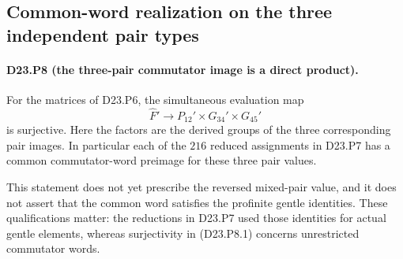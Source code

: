 \subsection{Common-word realization on the three independent pair types}

\paragraph{D23.P8 (the three-pair commutator image is a direct product).}
For the matrices of D23.P6, the simultaneous evaluation map
\[
 \widehat F'\longrightarrow
 P_{12}'\times G_{34}'\times G_{45}'
\tag{D23.P8.1}
\]
is surjective. Here the factors are the derived groups of the
three corresponding pair images. In particular each of the $216$
reduced assignments in D23.P7 has a common commutator-word
preimage for these three pair values.

This statement does not yet prescribe the reversed mixed-pair
value, and it does not assert that the common word satisfies
the profinite gentle identities. These qualifications matter:
the reductions in D23.P7 used those identities for actual gentle
elements, whereas surjectivity in (D23.P8.1) concerns unrestricted
commutator words.

